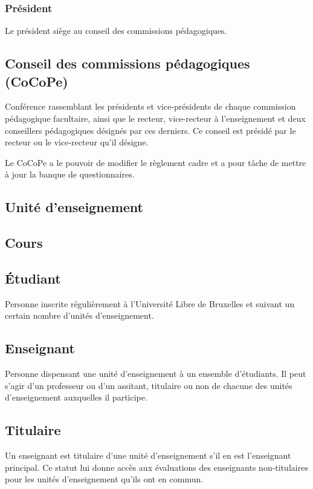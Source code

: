 \documentclass[a4paper,11pt]{report}
\begin{document}
\subsubsection{Président}
Le président siège au conseil des commissions pédagogiques.

\subsection{Conseil des commissions pédagogiques (CoCoPe)}
Conférence rassemblant les présidents et vice-présidents de chaque commission pédagogique facultaire, ainsi que le recteur, vice-recteur à l'enseignement et deux conseillers pédagogiques désignés par ces derniers.
Ce conseil est présidé par le recteur ou le vice-recteur qu'il désigne.

Le CoCoPe a le pouvoir de modifier le règlement cadre et a pour tâche de mettre à jour la banque de questionnaires.


\subsection{Unité d'enseignement}

\subsection{Cours}

\subsection{Étudiant}
Personne inscrite régulièrement à l'Université Libre de Bruxelles et suivant un certain nombre d'unités d'enseignement.

\subsection{Enseignant}
Personne dispensant une unité d'enseignement à un ensemble d'étudiants.
Il peut s'agir d'un professeur ou d'un assitant, titulaire ou non de chacune des unités d'enseignement auxquelles il participe.

\subsection{Titulaire}
Un enseignant est titulaire d'une unité d'enseignement s'il en est l'enseignant principal.
Ce statut lui donne accès aux évaluations des enseignants non-titulaires pour les unités d'enseignement qu'ils ont en commun.
\end{document}
